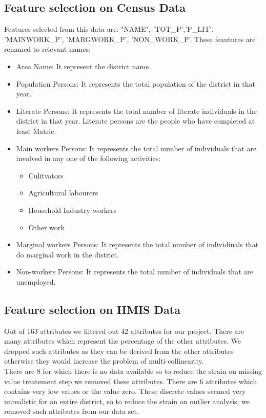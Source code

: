 \documentclass[12pt]{article}
\begin{document}
\subsection{Feature selection on Census Data}
Features selected from this data are: "NAME", 'TOT\_P','P\_LIT', 'MAINWORK\_P', 'MARGWORK\_P', 'NON\_WORK\_P'. These feautures are renamed to relevant names:
\begin{itemize}
	\item Area Name: It represent the district name.
	\item Population Persons: It represents the total population of the district in that year.
	\item Literate Persons: It represents the total number of literate individuals in the district in that year. Literate persons are the people who have completed at least Matric.
	\item Main workers Persons: It represents the total number of individuals that are involved in any one of the following activities:
	\begin{itemize}
		\item Culitvators
		\item Agricultural labourers
		\item Household Industry workers
		\item Other work
	\end{itemize}
	\item Marginal workers Persons: It represents the total number of individiuals that do marginal work in the district.
	\item Non-workers Persons: It represents the total number of individuals that are unemployed.
\end{itemize}

\subsection{Feature selection on HMIS Data}

Out of 163 attributes we filtered out 42 attributes for our project. There are many attributes which represent the percentage of the other attributes. We dropped such attributes as they can be derived from the other attributes otherwise they would increase the problem of multi-collinearity.\\

There are 8 for which there is no data available so to reduce the strain on missing value treatement step we removed these attributes. There are 6 attributes which contains very low values or the value zero. These discrete values seemed very unrealistic for an entire district, so to reduce the strain on outlier analysis, we removed such attributes from our data set. 
\end{document}
